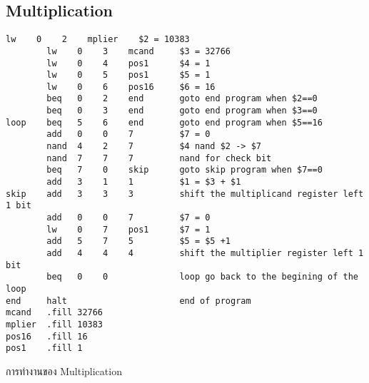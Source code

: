 \documentclass[14pt]{article}
\begin{document}
\subsection{Multiplication}
\begin{lstlisting}[style=assembly]
        lw    0    2    mplier    $2 = 10383
        lw    0    3    mcand     $3 = 32766
        lw    0    4    pos1      $4 = 1
        lw    0    5    pos1      $5 = 1
        lw    0    6    pos16     $6 = 16
        beq   0    2    end       goto end program when $2==0
        beq   0    3    end       goto end program when $3==0
loop    beq   5    6    end       goto end program when $5==16
        add   0    0    7         $7 = 0
        nand  4    2    7         $4 nand $2 -> $7
        nand  7    7    7         nand for check bit
        beq   7    0    skip      goto skip program when $7==0
        add   3    1    1         $1 = $3 + $1
skip    add   3    3    3         shift the multiplicand register left 1 bit
        add   0    0    7         $7 = 0
        lw    0    7    pos1      $7 = 1
        add   5    7    5         $5 = $5 +1
        add   4    4    4         shift the multiplier register left 1 bit
        beq   0    0              loop go back to the begining of the loop
end     halt                      end of program
mcand   .fill 32766
mplier  .fill 10383
pos16   .fill 16
pos1    .fill 1
\end{lstlisting}
การทำงานของ Multiplication
\end{document}
